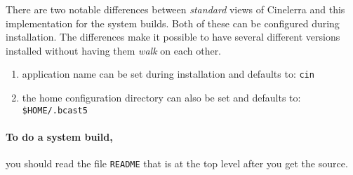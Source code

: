 There are two notable differences between \textit{standard} views of Cinelerra and this implementation for the system builds.  
Both of these can be configured during installation.  
The differences make it possible to have several different versions installed without having them \textit{walk} on each other. 

\begin{enumerate}
    \item 
        application name can be set during installation and defaults to: \texttt{cin}
    \item 
        the home configuration directory can also be set and defaults to:\\ \texttt{\$HOME/.bcast5}
\end{enumerate}

\paragraph{To do a system build,} you should read the file \texttt{README} that is at the top level after you get the source.


